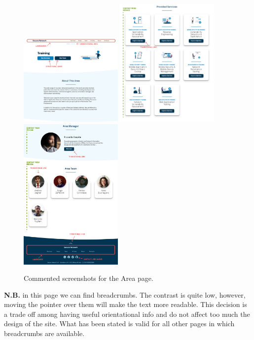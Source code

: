 \documentclass[12pt]{report}
\begin{document}
\begin{figure}[H]
	\centering
	\includegraphics[width=0.45\textwidth]{high_fid_wireframes/area/1.png}
	\includegraphics[width=0.45\textwidth]{high_fid_wireframes/area/2.png}
	\includegraphics[width=0.45\textwidth]{high_fid_wireframes/area/3.png}
	\caption{Commented screenshots for the Area page.}
\end{figure}
\textbf{N.B.} in this page we can find breadcrumbs. The contrast is quite low,
however, moving the pointer over them will make the text more readable. This 
decision is a trade off among having useful orientational info and do not affect
too much the design of the site. What has been stated is valid for all other pages
in which breadcrumbs are available.
\end{document}
